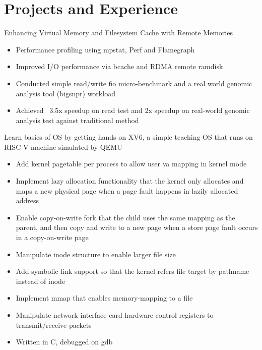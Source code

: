 \section{Projects and Experience}

{Enhancing Virtual Memory and Filesystem Cache with Remote Memories}
{}
{}

\begin{itemize}
		\setlength\topsep{0em}
		\setlength\parskip{0em}
		\setlength\parsep{0em}
		\setlength\itemsep{0em}
	\item Performance profiling using mpstat, Perf and Flamegraph
	\item Improved I/O performance via bcache and RDMA remote ramdisk
  \item Conducted simple read/write fio micro-benchmark and a real world genomic analysis tool (bigsnpr) workload 
	\item Achieved ~3.5x speedup on read test and 2x speedup on real-world genomic analysis test against traditional method 
\end{itemize}

{Learn basics of OS by getting hands on XV6, a simple teaching OS that runs on RISC-V machine simulated by QEMU} {} {}
\begin{itemize}
\setlength\topsep{-0.1em}
\setlength\parskip{-0.1em}
\setlength\parsep{-0.1em}
\setlength\itemsep{-0.1em}
  \item Add kernel pagetable per process to allow user va mapping in kernel mode  
  \item Implement lazy allocation functionality that the kernel only allocates and maps a new physical page when a page fault happens in lazily allocated address
  \item Enable copy-on-write fork that the child uses the same mapping as the parent, and then copy and write to a new page when a store page fault occurs in a copy-on-write page
  \item Manipulate inode structure to enable larger file size
  \item Add symbolic link support so that the kernel refers file target by pathname instead of inode
  \item Implement mmap that enables memory-mapping to a file
  \item Manipulate network interface card hardware control registers to transmit/receive packets 
  \item Written in C, debugged on gdb
\end{itemize}

